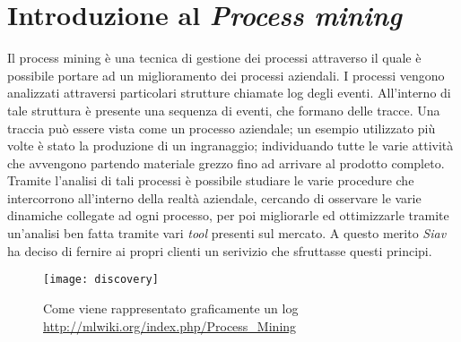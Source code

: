 \section{Introduzione al \textit{Process mining}}
Il process mining è una tecnica di gestione dei processi attraverso il quale è possibile portare ad un miglioramento dei processi aziendali. I processi vengono analizzati attraversi particolari strutture chiamate log degli eventi. All'interno di tale struttura è presente una sequenza di eventi, che formano delle tracce. Una traccia può essere vista come un processo aziendale; un esempio utilizzato più volte è stato la produzione di un ingranaggio; individuando tutte le varie attività che avvengono partendo materiale grezzo fino ad arrivare al prodotto completo. Tramite l'analisi di tali processi è possibile studiare le varie procedure che intercorrono all'interno della realtà aziendale, cercando di osservare le varie dinamiche collegate ad ogni processo, per poi migliorarle ed ottimizzarle tramite un'analisi ben fatta tramite vari \textit{tool} presenti sul mercato. A questo merito \textit{Siav} ha deciso di fernire ai propri clienti un serivizio che sfruttasse questi principi.
\begin{figure}[!h] 
	\centering 
	\texttt{[image: discovery]} 
	\caption{Come viene rappresentato graficamente un log \url{http://mlwiki.org/index.php/Process_Mining}}
\end{figure}
